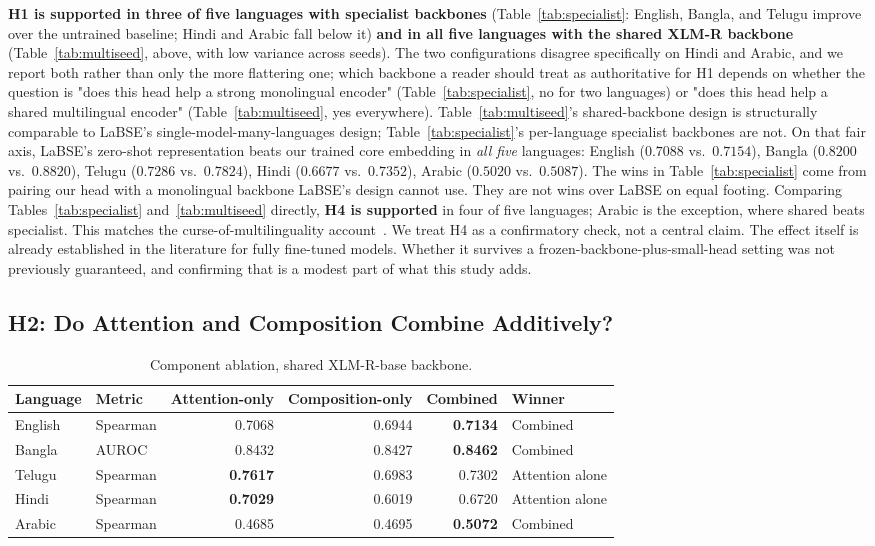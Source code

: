 \documentclass[manuscript]{acmart}
\begin{document}
\textbf{H1 is supported in three of five languages with specialist backbones} (Table~\ref{tab:specialist}: English, Bangla, and Telugu improve over the untrained baseline; Hindi and Arabic fall below it) \textbf{and in all five languages with the shared XLM-R backbone} (Table~\ref{tab:multiseed}, above, with low variance across seeds). The two configurations disagree specifically on Hindi and Arabic, and we report both rather than only the more flattering one; which backbone a reader should treat as authoritative for H1 depends on whether the question is "does this head help a strong monolingual encoder" (Table~\ref{tab:specialist}, no for two languages) or "does this head help a shared multilingual encoder" (Table~\ref{tab:multiseed}, yes everywhere). Table~\ref{tab:multiseed}'s shared-backbone design is structurally comparable to LaBSE's single-model-many-languages design; Table~\ref{tab:specialist}'s per-language specialist backbones are not. On that fair axis, LaBSE's zero-shot representation beats our trained core embedding in \emph{all five} languages: English ($0.7088$ vs.\ $0.7154$), Bangla ($0.8200$ vs.\ $0.8820$), Telugu ($0.7286$ vs.\ $0.7824$), Hindi ($0.6677$ vs.\ $0.7352$), Arabic ($0.5020$ vs.\ $0.5087$). The wins in Table~\ref{tab:specialist} come from pairing our head with a monolingual backbone LaBSE's design cannot use. They are not wins over LaBSE on equal footing. Comparing Tables~\ref{tab:specialist} and~\ref{tab:multiseed} directly, \textbf{H4 is supported} in four of five languages; Arabic is the exception, where shared beats specialist. This matches the curse-of-multilinguality account~\citep{conneau2020xlmr}. We treat H4 as a confirmatory check, not a central claim. The effect itself is already established in the literature for fully fine-tuned models. Whether it survives a frozen-backbone-plus-small-head setting was not previously guaranteed, and confirming that is a modest part of what this study adds.

\subsection{H2: Do Attention and Composition Combine Additively?}

\begin{table}[h]
\caption{Component ablation, shared XLM-R-base backbone.}
\label{tab:ablation}
\begin{tabular}{@{}llrrrl@{}}
\toprule
Language & Metric & Attention-only & Composition-only & Combined & Winner \\
\midrule
English & Spearman & 0.7068 & 0.6944 & \textbf{0.7134} & Combined \\
Bangla  & AUROC    & 0.8432 & 0.8427 & \textbf{0.8462} & Combined \\
Telugu  & Spearman & \textbf{0.7617} & 0.6983 & 0.7302 & Attention alone \\
Hindi   & Spearman & \textbf{0.7029} & 0.6019 & 0.6720 & Attention alone \\
Arabic  & Spearman & 0.4685 & 0.4695 & \textbf{0.5072} & Combined \\
\bottomrule
\end{tabular}
\end{table}
\end{document}
